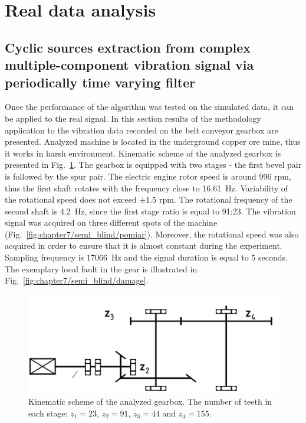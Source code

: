 \section{Real data analysis}
\subsection{Cyclic sources extraction from complex multiple-component vibration signal via periodically time varying filter}
\label{sec:chapter7/semi_blind/schemat_przekladniaapplication_real}
Once the performance of the algorithm was tested on the simulated data, it can be applied to the real signal. In this section results of the methodology application to the vibration data recorded on the belt conveyor gearbox are presented. Analyzed machine is located in the underground copper ore mine, thus it works in harsh environment. Kinematic scheme of the analyzed gearbox is presented in Fig.~\ref{fig:chapter7/semi_blind/schemat_przekladnia}. The gearbox is equipped with two stages - the first bevel pair is followed by the spur pair. The electric engine rotor speed is around 996 rpm, thus the first shaft rotates with the frequency close to 16.61~Hz. Variability of the rotational speed does not exceed $\pm1.5$ rpm. The rotational frequency of the second shaft is 4.2~Hz, since the first stage ratio is equal to 91:23. The vibration signal was acquired on three different spots of the machine (Fig.~\ref{fig:chapter7/semi_blind/pomiar}). Moreover, the rotational speed was also acquired in order to ensure that it is almost constant during the experiment. Sampling frequency is 17066~Hz and the signal duration is equal to 5 seconds. The exemplary local fault in the gear is illustrated in Fig.~\ref{fig:chapter7/semi_blind/damage}.
%
\begin{figure}[ht!]
\centering
\includegraphics[width=1\textwidth]{wykresy/chapter_application/semi_blind/schemat_przekladnia}
\caption{Kinematic scheme of the analyzed gearbox. The number of teeth in each stage: $z_1=23$, $z_2=91$, $z_3=44$ and $z_4=155$.}
\label{fig:chapter7/semi_blind/schemat_przekladnia}
\end{figure}
